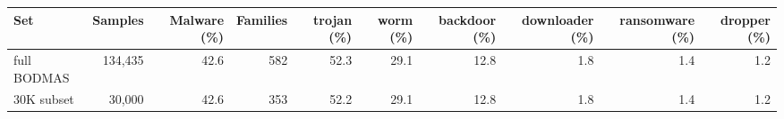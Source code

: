 \begin{tabular}{lrrrrrrrrr}
\toprule
Set & Samples & Malware (\%) & Families & trojan (\%) & worm (\%) & backdoor (\%) & downloader (\%) & ransomware (\%) & dropper (\%) \\
\midrule
full BODMAS & 134{,}435 & 42.6 & 582 & 52.3 & 29.1 & 12.8 & 1.8 & 1.4 & 1.2 \\
30K subset & 30{,}000 & 42.6 & 353 & 52.2 & 29.1 & 12.8 & 1.8 & 1.4 & 1.2 \\
\bottomrule
\end{tabular}
